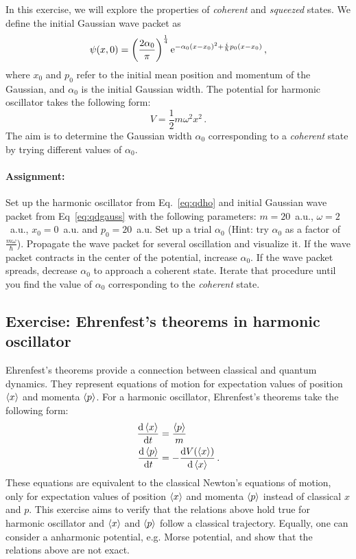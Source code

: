 In this exercise, we will explore the properties of \textit{coherent} and \textit{squeezed} states. We define the initial Gaussian wave packet as
\begin{equation}
    \psi(x,0) = \left(\frac{2\alpha_0}{\pi}\right)^{\frac{1}{4}} \mathrm{e}^{-\alpha_0(x-x_0)^2 +\frac{i}{\hbar}p_0(x-x_0)} \, ,
    \label{eq:qdgauss}
\end{equation}
where $x_0$ and $p_0$ refer to the initial mean position and momentum of the Gaussian, and $\alpha_0$ is the initial Gaussian width. The potential for harmonic oscillator takes the following form:
\begin{equation}
    V = \frac{1}{2}m\omega^2x^2 \, .
    \label{eq:qdho}
\end{equation}
The aim is to determine the Gaussian width $\alpha_0$ corresponding to a \textit{coherent} state by trying different values of $\alpha_0$.

\paragraph{Assignment:} Set up the harmonic oscillator from Eq.~\eqref{eq:qdho} and initial Gaussian wave packet from Eq~\eqref{eq:qdgauss} with the following parameters: $m=20$~a.u., $\omega=2$~a.u., $x_0=0$~a.u. and $p_0=20$~a.u. Set up a trial $\alpha_0$ (Hint: try $\alpha_0$ as a factor of $\frac{m\omega}{\hbar}$). Propagate the wave packet for several oscillation and visualize it. If the wave packet contracts in the center of the potential, increase $\alpha_0$. If the wave packet spreads, decrease $\alpha_0$ to approach a coherent state. Iterate that procedure until you find the value of $\alpha_0$ corresponding to the \textit{coherent} state. 

\subsection*{Exercise: Ehrenfest's theorems in harmonic oscillator}

Ehrenfest's theorems provide a connection between classical and quantum dynamics. They represent equations of motion for expectation values of position $\braket{x}$ and momenta $\braket{p}$. For a harmonic oscillator, Ehrenfest's theorems take the following form:
\begin{align*}
    \frac{\mathop{}\!\mathrm{d} \braket{x}}{\mathop{}\!\mathrm{d} t} &= \frac{\braket{p}}{m} \\
    \frac{\mathop{}\!\mathrm{d} \braket{p}}{\mathop{}\!\mathrm{d} t} &= -\frac{\mathop{}\!\mathrm{d} V(\braket{x})}{\mathop{}\!\mathrm{d} \braket{x}} \, .
\end{align*}
These equations are equivalent to the classical Newton's equations of motion, only for expectation values of position $\braket{x}$ and momenta $\braket{p}$ instead of classical $x$ and $p$. This exercise aims to verify that the relations above hold true for harmonic oscillator and $\braket{x}$ and $\braket{p}$ follow a classical trajectory. Equally, one can consider a anharmonic potential, e.g. Morse potential, and show that the relations above are not exact.


